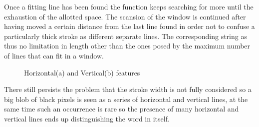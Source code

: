 Once a fitting line has been found the function keeps searching for more until the exhaustion of the allotted space. The scansion of the window is continued after having moved a certain distance from the last line found in order not to confuse a particularly thick stroke as different separate lines.
The corresponding string as thus no limitation in length other than the ones posed by the maximum number of lines that can fit in a window.

\begin{figure}[!htpb]
 \centering
 \hspace{15mm}
 \caption{Horizontal(a) and Vertical(b) features}
  \end{figure}
\vspace{2mm}

There still persists the problem that the stroke width is not fully considered so a big blob of black pixels is seen as a series of horizontal and vertical lines, at the same time such an occurrence is rare so the presence of many horizontal and vertical lines ends up distinguishing the word in itself.    
\newpage
